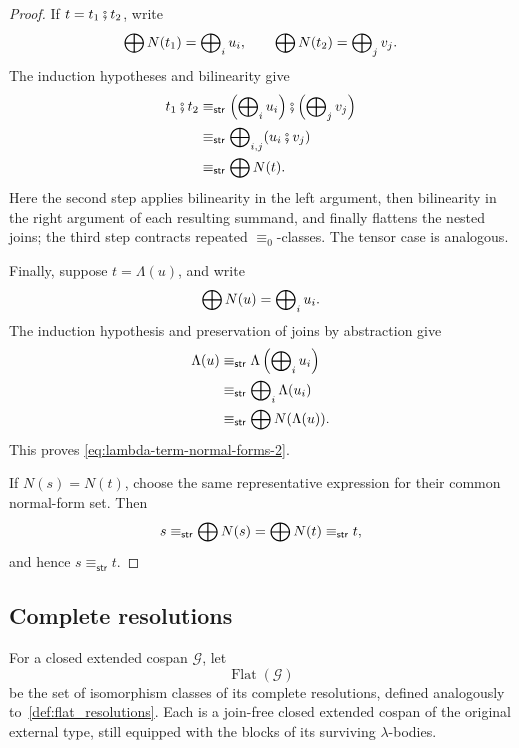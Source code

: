 \begin{proof}
If \(t=t_1\fatsemi t_2\), write
\[
  \operatorname{\bigoplus} N(t_1)=\operatorname{\bigoplus}_i u_i,
  \qquad
  \operatorname{\bigoplus} N(t_2)=\operatorname{\bigoplus}_j v_j.
\]
The induction hypotheses and bilinearity give
\[
\begin{aligned}
  t_1\fatsemi t_2
  &\equiv_{\mathsf{str}}
  \left(\operatorname{\bigoplus}_i u_i\right)
  \fatsemi
  \left(\operatorname{\bigoplus}_j v_j\right)\\
  &\equiv_{\mathsf{str}}
  \operatorname{\bigoplus}_{i,j}(u_i\fatsemi v_j)\\
  &\equiv_{\mathsf{str}}
  \operatorname{\bigoplus} N(t).
\end{aligned}
\]
Here the second step applies bilinearity in the left argument, then
bilinearity in the right argument of each resulting summand, and
finally flattens the nested joins; the third step contracts repeated
\(\equiv_0\)-classes.
The tensor case is analogous.

Finally, suppose \(t=\Lambda(u)\), and write
\[
  \operatorname{\bigoplus} N(u)=\operatorname{\bigoplus}_i u_i.
\]
The induction hypothesis and preservation of joins by abstraction give
\[
\begin{aligned}
  \Lambda(u)
  &\equiv_{\mathsf{str}}
  \Lambda\left(\operatorname{\bigoplus}_i u_i\right)\\
  &\equiv_{\mathsf{str}}
  \operatorname{\bigoplus}_i\Lambda(u_i)\\
  &\equiv_{\mathsf{str}}
  \operatorname{\bigoplus} N(\Lambda(u)).
\end{aligned}
\]
This proves \eqref{eq:lambda-term-normal-forms-2}.

If \(N(s)=N(t)\), choose the same representative expression for their
common normal-form set. Then
\[
  s
  \equiv_{\mathsf{str}}
  \operatorname{\bigoplus} N(s)
  =
  \operatorname{\bigoplus} N(t)
  \equiv_{\mathsf{str}}
  t,
\]
and hence \(s\equiv_{\mathsf{str}}t\).
\end{proof}

\subsection{Complete resolutions}

For a closed extended cospan $\mathcal G$, let
\[
 \operatorname{Flat}(\mathcal G)
\]
be the set of isomorphism classes of its complete
resolutions, defined analogously to~\cref{def:flat_resolutions}. 
Each is a join-free closed extended cospan of the original
external type, still equipped with the blocks of its surviving
$\lambda$-bodies.


